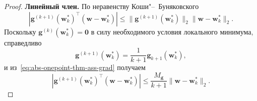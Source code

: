 \begin{proof}
    \textbf{Линейный член.} По неравенству Коши"--~Буняковского
    \begin{equation}
        \left|
            \mathbf g^{(k+1)}(\mathbf w_k^*)^\top
            (\mathbf w-\mathbf w_k^*)
        \right|
        \leqslant
        \|\mathbf g^{(k+1)}(\mathbf w_k^*)\|_2
        \|\mathbf w-\mathbf w_k^*\|_2.
    \end{equation}
    Поскольку $\mathbf g^{(k)}(\mathbf w_k^*)=\mathbf 0$ в силу необходимого условия локального минимума, справедливо
    \begin{equation}
        \mathbf g^{(k+1)}(\mathbf w_k^*)
        =
        \frac{1}{k+1}
        \mathbf g_{k+1}(\mathbf w_k^*),
    \end{equation}
    и из~\eqref{eq:abs-onepoint-thm-ass-grad} получаем
    \begin{equation}
        \label{eq:abs-onepoint-linear}
        \left|
            \mathbf g^{(k+1)}(\mathbf w_k^*)^\top
            (\mathbf w-\mathbf w_k^*)
        \right|
        \leqslant
        \frac{M_{\mathbf g}}{k+1}
        \|\mathbf w-\mathbf w_k^*\|_2.
    \end{equation}


\end{proof}
